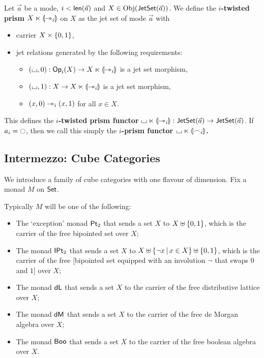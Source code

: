 \documentclass[a4paper]{article}
\begin{document}
\begin{definition} \label{def:prism}
	Let $\vec a$ be a mode, $i < \mathsf{len}(\vec a)$ and $X \in \mathrm{Obj}(\mathsf{JetSet}\mathopen{}\left( \vec a \right)\mathclose{})$.
	We define the \textbf{$i$-twisted prism $X \ltimes {\llparenthesis \rightarrowtriangle_i \rrparenthesis}$} on $X$ as the jet set of mode $\vec a$ with
	\begin{itemize}
		\item carrier $X \times \mathopen{}\left\{ 0, 1 \right\}\mathclose{}$,
		\item jet relations generated by the following requirements:
		\begin{itemize}
			\item $({\llcorner\hspace{-.4ex}\lrcorner}, 0) : {\mathsf{Op}}_i(X) \to X \ltimes {\llparenthesis \rightarrowtriangle_i \rrparenthesis}$ is a jet set morphism,
			\item $({\llcorner\hspace{-.4ex}\lrcorner}, 1) : X \to X \ltimes {\llparenthesis \rightarrowtriangle_i \rrparenthesis}$ is a jet set morphism,
			\item $(x, 0) \rightarrowtriangle_i (x, 1)$ for all $x \in X$.
		\end{itemize}
	\end{itemize}
	This defines the \textbf{$i$-twisted prism functor} ${\llcorner\hspace{-.4ex}\lrcorner} \ltimes {\llparenthesis \rightarrowtriangle_i \rrparenthesis} : \mathsf{JetSet}\mathopen{}\left( \vec a \right)\mathclose{} \to \mathsf{JetSet}\mathopen{}\left( \vec a \right)\mathclose{}$.
	If $a_i = \npolar$, then we call this simply the \textbf{$i$-prism functor ${\llcorner\hspace{-.4ex}\lrcorner} \ltimes {\llparenthesis \frown_i \rrparenthesis}$.}
\end{definition}

\subsection{Intermezzo: Cube Categories} \label{sec:cubes}
We introduce a family of cube categories with one flavour of dimension. Fix a monad $M$ on ${\mathsf{Set}}$.
\begin{example} \label{ex:cube-monads}
	Typically $M$ will be one of the following:
	\begin{itemize}
		\item The `exception' monad ${\mathsf{Pt}_2}$ that sends a set $X$ to $X \uplus \mathopen{}\left\{ 0,1 \right\}\mathclose{}$, which is the carrier of the free bipointed set over $X$;
		\item The monad ${\mathsf{IPt}_2}$ that sends a set $X$ to $X \uplus \mathopen{}\left\{ \lnot x \,\middle|\, x \in X \right\}\mathclose{} \uplus \mathopen{}\left\{ 0, 1 \right\}\mathclose{}$, which is the carrier of the free [bipointed set equipped with an involution $\lnot$ that swaps $0$ and $1$] over $X$;
		\item The monad $\mathsf{dL}$ that sends a set $X$ to the carrier of the free distributive lattice over $X$;
		\item The monad $\mathsf{dM}$ that sends a set $X$ to the carrier of the free de Morgan algebra over $X$;
		\item The monad $\mathsf{Boo}$ that sends a set $X$ to the carrier of the free boolean algebra over $X$.
	\end{itemize}
\end{example}
\end{document}
